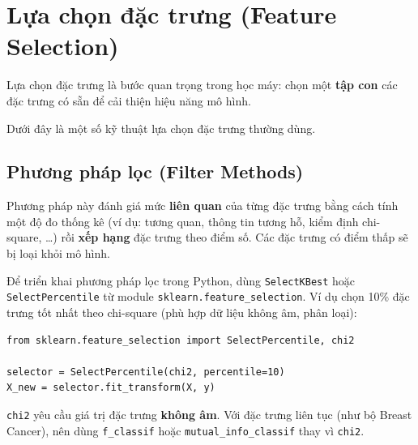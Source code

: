 \section{Lựa chọn đặc trưng (Feature Selection)}
\label{sec:feature-selection}

\begin{dinhnghia}[title={Lựa chọn đặc trưng}]
Lựa chọn đặc trưng là bước quan trọng trong học máy: chọn một \textbf{tập con} các đặc trưng có sẵn để cải thiện hiệu năng mô hình.
\end{dinhnghia}

\begin{ynghia}[title={Các kỹ thuật phổ biến}]
Dưới đây là một số kỹ thuật lựa chọn đặc trưng thường dùng.
\end{ynghia}

\subsection{Phương pháp lọc (Filter Methods)}

\begin{phuongphap}[title={Ý tưởng Filter}]
Phương pháp này đánh giá mức \textbf{liên quan} của từng đặc trưng bằng cách tính một độ đo thống kê (ví dụ: tương quan, thông tin tương hỗ, kiểm định chi-square, \ldots) rồi \textbf{xếp hạng} đặc trưng theo điểm số. Các đặc trưng có điểm thấp sẽ bị loại khỏi mô hình.
\end{phuongphap}

\begin{vidu}[title={Filter trong Python --- SelectPercentile và chi2}]
Để triển khai phương pháp lọc trong Python, dùng \texttt{SelectKBest} hoặc \texttt{SelectPercentile} từ module \texttt{sklearn.feature\_selection}. Ví dụ chọn 10\% đặc trưng tốt nhất theo chi-square (phù hợp dữ liệu không âm, phân loại):
\begin{lstlisting}
from sklearn.feature_selection import SelectPercentile, chi2

selector = SelectPercentile(chi2, percentile=10)
X_new = selector.fit_transform(X, y)
\end{lstlisting}
\end{vidu}

\begin{luuy}[title={Chi-square và kiểu dữ liệu}]
\texttt{chi2} yêu cầu giá trị đặc trưng \textbf{không âm}. Với đặc trưng liên tục (như bộ Breast Cancer), nên dùng \texttt{f\_classif} hoặc \texttt{mutual\_info\_classif} thay vì \texttt{chi2}.
\end{luuy}

